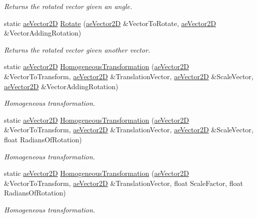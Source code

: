 \begin{DoxyCompactItemize}
\begin{DoxyCompactList}\small\item\em Returns the rotated vector given an angle. \end{DoxyCompactList}\item 
static \hyperlink{structae_core_1_1ae_vector2_d}{ae\+Vector2D} \hyperlink{structae_core_1_1ae_matrix2_d_adf56d09a1fe07265cf3e66d91f33b81e}{Rotate} (\hyperlink{structae_core_1_1ae_vector2_d}{ae\+Vector2D} \&Vector\+To\+Rotate, \hyperlink{structae_core_1_1ae_vector2_d}{ae\+Vector2D} \&Vector\+Adding\+Rotation)
\begin{DoxyCompactList}\small\item\em Returns the rotated vector given another vector. \end{DoxyCompactList}\item 
static \hyperlink{structae_core_1_1ae_vector2_d}{ae\+Vector2D} \hyperlink{structae_core_1_1ae_matrix2_d_ab595798bfb8e95ed28be4cc7ba5f2fcc}{Homogeneous\+Transformation} (\hyperlink{structae_core_1_1ae_vector2_d}{ae\+Vector2D} \&Vector\+To\+Transform, \hyperlink{structae_core_1_1ae_vector2_d}{ae\+Vector2D} \&Translation\+Vector, \hyperlink{structae_core_1_1ae_vector2_d}{ae\+Vector2D} \&Scale\+Vector, \hyperlink{structae_core_1_1ae_vector2_d}{ae\+Vector2D} \&Vector\+Adding\+Rotation)
\begin{DoxyCompactList}\small\item\em Homogeneous transformation. \end{DoxyCompactList}\item 
static \hyperlink{structae_core_1_1ae_vector2_d}{ae\+Vector2D} \hyperlink{structae_core_1_1ae_matrix2_d_a8f9c633d33f4e33f0b38b6dd4244ec7a}{Homogeneous\+Transformation} (\hyperlink{structae_core_1_1ae_vector2_d}{ae\+Vector2D} \&Vector\+To\+Transform, \hyperlink{structae_core_1_1ae_vector2_d}{ae\+Vector2D} \&Translation\+Vector, \hyperlink{structae_core_1_1ae_vector2_d}{ae\+Vector2D} \&Scale\+Vector, float Radians\+Of\+Rotation)
\begin{DoxyCompactList}\small\item\em Homogeneous transformation. \end{DoxyCompactList}\item 
static \hyperlink{structae_core_1_1ae_vector2_d}{ae\+Vector2D} \hyperlink{structae_core_1_1ae_matrix2_d_a4972a1665dd5622604f920ebd3ee7a7e}{Homogeneous\+Transformation} (\hyperlink{structae_core_1_1ae_vector2_d}{ae\+Vector2D} \&Vector\+To\+Transform, \hyperlink{structae_core_1_1ae_vector2_d}{ae\+Vector2D} \&Translation\+Vector, float Scale\+Factor, float Radians\+Of\+Rotation)
\begin{DoxyCompactList}\small\item\em Homogeneous transformation. \end{DoxyCompactList}\end{DoxyCompactItemize}
